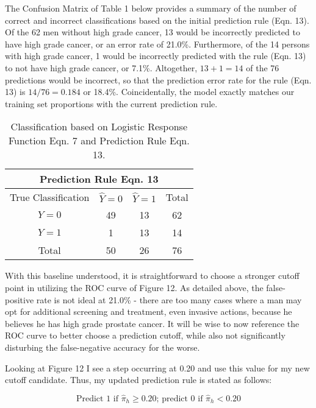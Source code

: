 The Confusion Matrix of Table 1 below provides a summary of the number of correct and incorrect classifications based on the initial prediction rule (Eqn. 13). Of the 62 men without high grade cancer, 13 would be incorrectly predicted to have high grade cancer, or an error rate of 21.0\%. Furthermore, of the 14 persons with high grade cancer, 1 would be incorrectly predicted with the rule (Eqn. 13) to not have high grade cancer, or 7.1\%. Altogether, \(13+1=14\) of the 76 predictions would be incorrect, so that the prediction error rate for the rule (Eqn. 13) is \(14/76=0.184\) or 18.4\%. Coincidentally, the model exactly matches our training set proportions with the current prediction rule. \par

\begin{table}[H]
	\centering
	\begin{tabular}{ |c||c|c||c|  }
 	\hline
 	\multicolumn{4}{|c|}{Prediction Rule Eqn. 13} \\
 	\hline\hline
 	True Classification&\(\hat{Y}=0\)&\(\hat{Y}=1\)&Total\\
 	\hline
 	\(Y=0\)&49&13&62\\
 	\(Y=1\)&1&13&14\\
 	\hline\hline
 	Total&50&26&76\\
 	\hline
	\end{tabular}
 	\caption{Classification based on Logistic Response Function Eqn. 7 and Prediction Rule Eqn. 13.}
\end{table}

With this baseline understood, it is straightforward to choose a stronger cutoff point in utilizing the ROC curve of Figure 12. As detailed above, the false-positive rate is not ideal at 21.0\% - there are too many cases where a man may opt for additional screening and treatment, even invasive actions, because he believes he has high grade prostate cancer. It will be wise to now reference the ROC curve to better choose a prediction cutoff, while also not significantly disturbing the false-negative accuracy for the worse. \par
Looking at Figure 12 I see a step occurring at 0.20 and use this value for my new cutoff candidate. Thus, my updated prediction rule is stated as follows:

\begin{equation}
	\textrm{Predict 1 if } \hat{\pi}_h \geq 0.20\textrm{; predict 0 if } \hat{\pi}_h < 0.20
\end{equation}

